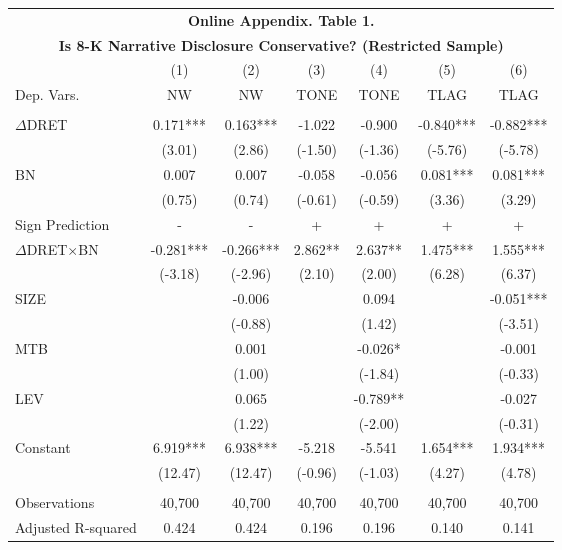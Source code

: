 \begin{table}[H]	\label{oat1}%
	\centering
	\begin{tabular}{lcccccc}
		\multicolumn{7}{c}{\textbf{Online Appendix. Table 1.}} \\
		\multicolumn{7}{c}{\textbf{Is 8-K Narrative Disclosure Conservative? (Restricted Sample)}} \\
		\midrule
		\midrule
		& (1) & (2) & (3) & (4) & (5) & (6) \\
		Dep. Vars. & NW & NW & TONE & TONE & TLAG & TLAG \\
		\midrule
		&   &   &   &   &   &  \\
		$\Delta$DRET & 0.171*** & 0.163*** & -1.022 & -0.900 & -0.840*** & -0.882*** \\
		& (3.01) & (2.86) & (-1.50) & (-1.36) & (-5.76) & (-5.78) \\
		BN & 0.007 & 0.007 & -0.058 & -0.056 & 0.081*** & 0.081*** \\
		& (0.75) & (0.74) & (-0.61) & (-0.59) & (3.36) & (3.29) \\
		\rowcolor[rgb]{ .933,  .925,  .882} Sign Prediction & - & - & + & + & + & + \\
		\rowcolor[rgb]{ .933,  .925,  .882} $\Delta$DRET$\times$BN & -0.281*** & -0.266*** & 2.862** & 2.637** & 1.475*** & 1.555*** \\
		\rowcolor[rgb]{ .933,  .925,  .882}   & (-3.18) & (-2.96) & (2.10) & (2.00) & (6.28) & (6.37) \\
		SIZE &   & -0.006 &   & 0.094 &   & -0.051*** \\
		&   & (-0.88) &   & (1.42) &   & (-3.51) \\
		MTB &   & 0.001 &   & -0.026* &   & -0.001 \\
		&   & (1.00) &   & (-1.84) &   & (-0.33) \\
		LEV &   & 0.065 &   & -0.789** &   & -0.027 \\
		&   & (1.22) &   & (-2.00) &   & (-0.31) \\
		Constant & 6.919*** & 6.938*** & -5.218 & -5.541 & 1.654*** & 1.934*** \\
		& (12.47) & (12.47) & (-0.96) & (-1.03) & (4.27) & (4.78) \\
		&   &   &   &   &   &  \\
		Observations & 40,700 & 40,700 & 40,700 & 40,700 & 40,700 & 40,700 \\
		Adjusted R-squared & 0.424 & 0.424 & 0.196 & 0.196 & 0.140 & 0.141 \\
		\bottomrule
		\bottomrule
	\end{tabular}%
\end{table}%
